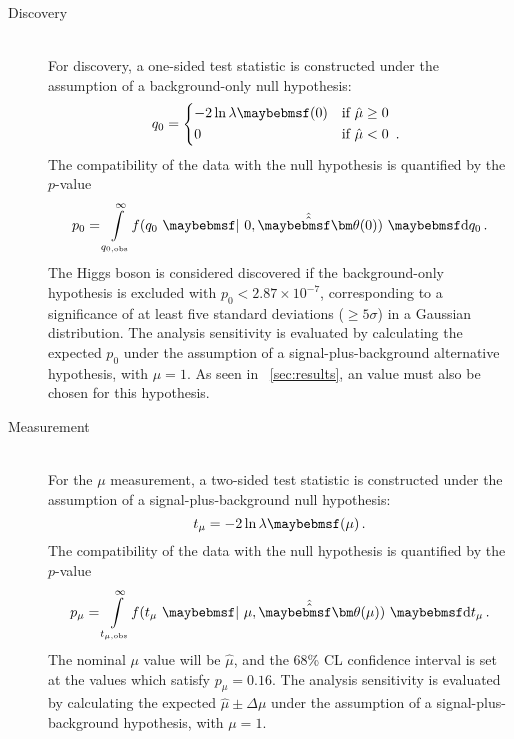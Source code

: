 \begin{description}
\item[Discovery] \hfill \\
	For discovery, a one-sided test statistic is constructed under the assumption of a 
	background-only null hypothesis:
	\begin{equation}
		q_0 = 
		\begin{dcases*}
			-2 \ln \lambda\parenths{0} & if $\hat{\mu} \geq 0$ \\
			0 & if $\hat{\mu} < 0$ \,.
		\end{dcases*}
	\end{equation}
	The compatibility of the data with the null hypothesis is quantified by the $p$-value
	\begin{equation}
		p_{0} = \int\limits_{q_{0,\text{obs}}}^{\infty} \! f(q_{0}~\given~0, \hat{\hat{\bvec{\theta}}}(0)) \,\, \d{q_{0}} \,.
	\end{equation}
	The Higgs boson is considered discovered if the background-only hypothesis is excluded 
	with $p_0 < 2.87 \times 10^{-7}$, corresponding to a significance of at least five 
	standard deviations (\ie $\geq\!5\sigma$) in a Gaussian distribution. The analysis 
	sensitivity is evaluated by calculating the expected $p_0$ under the assumption of a 
	signal-plus-background alternative hypothesis, with $\mu = 1$. As seen in 
	\Section~\ref{sec:results}, an \mH value must also be chosen for this hypothesis.

\item[Measurement] \hfill \\
	For the $\mu$ measurement, a two-sided test statistic is constructed under the 
	assumption of a signal-plus-background null hypothesis:
	\begin{equation}
		t_{\mu} = -2 \ln \lambda\parenths{\mu} \,.
	\end{equation}
	The compatibility of the data with the null hypothesis is quantified by the $p$-value
	\begin{equation}
		p_{\mu} = \int\limits_{t_{\mu,\text{obs}}}^{\infty} \! f(t_{\mu}~\given~\mu, \hat{\hat{\bvec{\theta}}}(\mu)) \,\, \d{t_{\mu}} \,.
	\end{equation}
	The nominal $\mu$ value will be $\hat{\mu}$, and the 68\% CL confidence interval is 
	set at the values which	satisfy $p_{\mu} = 0.16$. The analysis sensitivity is evaluated 
	by calculating the expected $\hat{\mu} \pm \Delta\mu$ under the assumption of a 
	signal-plus-background hypothesis, with $\mu = 1$.

\end{description}



